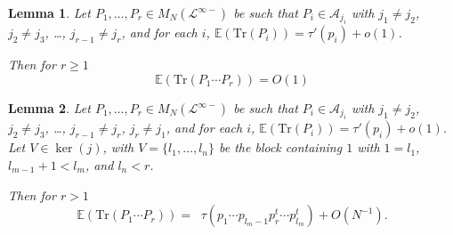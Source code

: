 \documentclass[10pt,a4paper]{amsart}
\newtheorem{lemma}{Lemma}
\newcommand{\Tr}{\mathrm{Tr}}
\newcommand{\cA}{\mathcal{A}}
\newcommand{\cL}{\mathcal{L}}
\newcommand{\rE} {\mathbb{E}}
\begin{document}
\begin{lemma}\label{lemma:first inside induction}
Let $P_1, \dots, P_r \in M_N(\cL^{\infty-})$ be such that
$P_i \in \cA_{j_i}$ with $j_1 \not= j_2$, $j_2 \not = j_3$,
\dots, $j_{r-1} \not = j_r$, and for each $i$,
$\rE(\Tr(P_i)) = \tau'(p_i) + o(1)$.

Then for $r \geq 1$
\begin{equation}\label{eq:first intermediate limit distribution}
\rE(\Tr(P_1 \cdots P_r))
= O(1)
\end{equation} 
\end{lemma}

\begin{lemma}\label{lemma:inside induction}
Let $P_1, \dots, P_r \in M_N(\cL^{\infty-})$ be such that
$P_i \in \cA_{j_i}$ with $j_1 \not= j_2$, $j_2 \not = j_3$,
\dots, $j_{r-1} \not = j_r$, $j_r \not = j_1$, and for each
$i$, $\rE(\Tr(P_i)) = \tau'(p_i) + o(1)$. Let $V \in
\ker(j)$, with $V = \{l_1, \dots, l_n\}$ be the block
containing $1$ with $1 = l_1$, $l_{m-1} + 1 < l_m$, and $l_n
< r$.

Then for $r > 1$
\begin{equation}\label{eq:intermediate limit distribution}
\rE(\Tr(P_1 \cdots P_r))
=
\mathop{\sum_{m=2}^{n}}
\tau(p_1 \cdots p_{l_m-1} p_r^t \cdots p_{l_m}^t )  + O(N^{-1}).
\end{equation}
\end{lemma}
\end{document}
